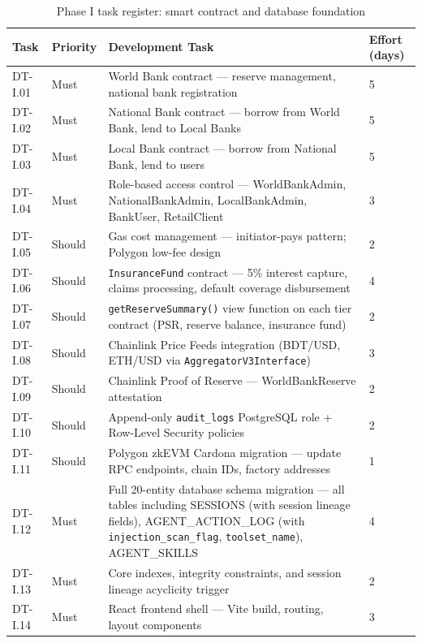 \documentclass[12pt,a4paper]{report}
\begin{document}
\begin{table}[H]
\centering
\caption[Phase I task register: smart contract and database foundation]{Phase I task register: smart contract and database foundation\footnotemark}
\label{tab:phaseI-contracts}
\small
\begin{tabular}{p{1.8cm}p{1.8cm}p{7.5cm}p{1.5cm}}
\hline
\textbf{Task} & \textbf{Priority} & \textbf{Development Task} & \textbf{Effort (days)} \\
\hline
DT-I.01 & Must & World Bank contract --- reserve management, national bank registration & 5 \\
DT-I.02 & Must & National Bank contract --- borrow from World Bank, lend to Local Banks & 5 \\
DT-I.03 & Must & Local Bank contract --- borrow from National Bank, lend to users & 5 \\
DT-I.04 & Must & Role-based access control --- WorldBankAdmin, NationalBankAdmin, LocalBankAdmin, BankUser, RetailClient & 3 \\
DT-I.05 & Should & Gas cost management --- initiator-pays pattern; Polygon low-fee design & 2 \\
DT-I.06 & Should & \texttt{InsuranceFund} contract --- 5\% interest capture, claims processing, default coverage disbursement & 4 \\
DT-I.07 & Should & \texttt{getReserveSummary()} view function on each tier contract (PSR, reserve balance, insurance fund) & 2 \\
DT-I.08 & Should & Chainlink Price Feeds integration (BDT/USD, ETH/USD via \texttt{AggregatorV3Interface}) & 3 \\
DT-I.09 & Should & Chainlink Proof of Reserve --- WorldBankReserve attestation & 2 \\
DT-I.10 & Should & Append-only \texttt{audit\_logs} PostgreSQL role + Row-Level Security policies & 2 \\
DT-I.11 & Should & Polygon zkEVM Cardona migration --- update RPC endpoints, chain IDs, factory addresses & 1 \\
\hline
DT-I.12 & Must & Full 20-entity database schema migration --- all tables including SESSIONS (with session lineage fields), AGENT\_ACTION\_LOG (with \texttt{injection\_scan\_flag}, \texttt{toolset\_name}), AGENT\_SKILLS & 4 \\
DT-I.13 & Must & Core indexes, integrity constraints, and session lineage acyclicity trigger & 2 \\
\hline
DT-I.14 & Must & React frontend shell --- Vite build, routing, layout components & 3 \\

\end{tabular}
\end{table}
\end{document}
